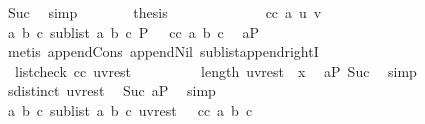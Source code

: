 \begin{isabellebody}
\ Suc\ \isamarkupfalse%
\ simp\isanewline
\ \ \ \ \isamarkupfalse%
\ \isamarkupfalse%
\ {\isacharquery}{\kern0pt}thesis\isanewline
\ \ \ \ \isamarkupfalse%
\isanewline
\ \ \ \ \ \ \isamarkupfalse%
\ {\isachardoublequoteopen}{\isasymnot}\ cc\ a\ u\ v{\isachardoublequoteclose}\isanewline
\ \ \ \ \ \ \isamarkupfalse%
\ {\isachardoublequoteopen}{\isasymexists}a\ b\ c{\isachardot}{\kern0pt}\ sublist\ {\isacharbrackleft}{\kern0pt}a{\isacharcomma}{\kern0pt}\ b{\isacharcomma}{\kern0pt}\ c{\isacharbrackright}{\kern0pt}\ P\ {\isasymand}\ {\isasymnot}\ cc\ a\ b\ c{\isachardoublequoteclose}\ \isamarkupfalse%
\ aP\isanewline
\ \ \ \ \ \ \ \ \isamarkupfalse%
\ {\isacharparenleft}{\kern0pt}metis\ append{\isacharunderscore}{\kern0pt}Cons\ append{\isacharunderscore}{\kern0pt}Nil\ sublist{\isacharunderscore}{\kern0pt}append{\isacharunderscore}{\kern0pt}rightI{\isacharparenright}{\kern0pt}\isanewline
\ \ \ \ \isamarkupfalse%
\isanewline
\ \ \ \ \ \ \isamarkupfalse%
\ {\isachardoublequoteopen}{\isasymnot}\ list{\isacharunderscore}{\kern0pt}check\ cc\ {\isacharparenleft}{\kern0pt}u{\isacharhash}{\kern0pt}v{\isacharhash}{\kern0pt}rest{\isacharparenright}{\kern0pt}{\isachardoublequoteclose}\isanewline
\ \ \ \ \ \ \isamarkupfalse%
\ \isamarkupfalse%
\ {\isachardoublequoteopen}length\ {\isacharparenleft}{\kern0pt}u{\isacharhash}{\kern0pt}v{\isacharhash}{\kern0pt}rest{\isacharparenright}{\kern0pt}\ {\isacharequal}{\kern0pt}\ x{\isachardoublequoteclose}\ \isamarkupfalse%
\ aP\ Suc{\isacharparenleft}{\kern0pt}{}{\isacharparenright}{\kern0pt}\ \isamarkupfalse%
\ simp\isanewline
\ \ \ \ \ \ \isamarkupfalse%
\ \isamarkupfalse%
\ {\isachardoublequoteopen}sdistinct\ {\isacharparenleft}{\kern0pt}u{\isacharhash}{\kern0pt}v{\isacharhash}{\kern0pt}rest{\isacharparenright}{\kern0pt}{\isachardoublequoteclose}\ \isamarkupfalse%
\ Suc{\isacharparenleft}{\kern0pt}{}{\isacharparenright}{\kern0pt}\ aP\ \isamarkupfalse%
\ simp\isanewline
\ \ \ \ \ \ \isamarkupfalse%
\ \isamarkupfalse%
\ {\isachardoublequoteopen}{\isasymexists}a\ b\ c{\isachardot}{\kern0pt}\ sublist\ {\isacharbrackleft}{\kern0pt}a{\isacharcomma}{\kern0pt}\ b{\isacharcomma}{\kern0pt}\ c{\isacharbrackright}{\kern0pt}\ {\isacharparenleft}{\kern0pt}u{\isacharhash}{\kern0pt}v{\isacharhash}{\kern0pt}rest{\isacharparenright}{\kern0pt}\ {\isasymand}\ {\isasymnot}\ cc\ a\ b\ c{\isachardoublequoteclose}\ \isamarkupfalse%

\end{isabellebody}
